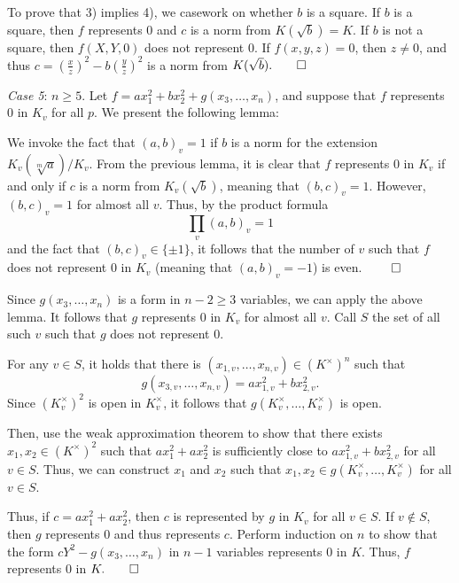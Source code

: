 \documentclass[a4paper, 12pt,oneside,openany]{book}
\begin{document}
To prove that 3) implies 4), we casework on whether $b$ is a square. If $b$ is a square, then $f$ represents 0 and $c$ is a norm from $K(\sqrt{b})=K$. If $b$ is not a square, then $f(X, Y, 0)$ does not represent 0. If $f(x, y, z)=0$, then $z \neq 0$, and thus $c = \left(\frac{x}{z}\right)^2 - b\left(\frac{y}{z}\right)^2$ is a norm from $K(\sqrt{b}). \qed$

\emph{Case 5}: $n\geq5$. Let $f = ax_1^2+bx_2^2+g(x_3, \dots, x_n)$, and suppose that $f$ represents 0 in $K_v$ for all $p$. We present the following lemma:


 We invoke the fact that $(a, b)_v = 1$ if $b$ is a norm for the extension $K_v(\sqrt[m]{a})/K_v$. From the previous lemma, it is clear that $f$ represents 0 in $K_v$ if and only if $c$ is a norm from $K_v(\sqrt{b})$, meaning that $(b, c)_v=1$. However, $(b, c)_v=1$ for almost all $v$. Thus, by the product formula $$\prod\limits_v (a, b)_v = 1$$ and the fact that $(b, c)_v \in \{\pm 1\}$, it follows that the number of $v$ such that $f$ does not represent 0 in $K_v$ (meaning that $(a, b)_v=-1$) is even. $\qed$

Since $g(x_3, \dots, x_n)$ is a form in $n-2 \geq 3$ variables, we can apply the above lemma. It follows that $g$ represents 0 in $K_v$ for almost all $v$. Call $S$ the set of all such $v$ such that $g$ does not represent 0. 

For any $v \in S$, it holds that there is $(x_{1, v}, \dots, x_{n, v}) \in (K^\times)^n$ such that $$g(x_{3, v}, \dots, x_{n, v}) = ax^2_{1, v}+bx^2_{2, v}.$$ Since $(K_v^\times)^2$ is open in $K_v^\times$, it follows that $g(K_v^\times, \dots, K_v^\times)$ is open. 

Then, use the weak approximation theorem to show that there exists $x_1, x_2 \in (K^\times)^2$ such that $ax_1^2+ax_2^2$ is sufficiently close to $ax^2_{1, v}+bx^2_{2, v}$ for all $v \in S$. Thus, we can construct $x_1$ and $x_2$ such that $x_1, x_2 \in g(K_v^\times, \dots, K_v^\times)$ for all $v \in S$. 

Thus, if $c=ax_1^2+ax_2^2$, then $c$ is represented by $g$ in $K_v$ for all $v \in S$. If $v \not\in S$, then $g$ represents 0 and thus represents $c$. Perform induction on $n$ to show that the form $cY^2-g(x_3, \dots, x_n)$ in $n-1$ variables represents 0 in $K$. Thus, $f$ represents 0 in $K. \qed$
\end{document}
